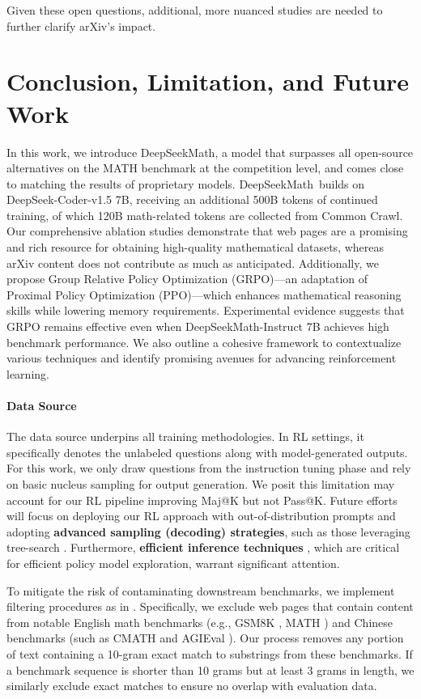 \begin{itemize}[topsep=0pt]
Given these open questions, additional, more nuanced studies are needed to further clarify arXiv’s impact.

\section{Conclusion, Limitation, and Future Work} In this work, we introduce DeepSeekMath, a model that surpasses all open-source alternatives on the MATH benchmark at the competition level, and comes close to matching the results of proprietary models. DeepSeekMath~builds on DeepSeek-Coder-v1.5 7B, receiving an additional 500B tokens of continued training, of which 120B math-related tokens are collected from Common Crawl. Our comprehensive ablation studies demonstrate that web pages are a promising and rich resource for obtaining high-quality mathematical datasets, whereas arXiv content does not contribute as much as anticipated. Additionally, we propose Group Relative Policy Optimization (GRPO)—an adaptation of Proximal Policy Optimization (PPO)—which enhances mathematical reasoning skills while lowering memory requirements. Experimental evidence suggests that GRPO remains effective even when DeepSeekMath-Instruct 7B achieves high benchmark performance. We also outline a cohesive framework to contextualize various techniques and identify promising avenues for advancing reinforcement learning.

\paragraph{Data Source} The data source underpins all training methodologies. In RL settings, it specifically denotes the unlabeled questions along with model-generated outputs. For this work, we only draw questions from the instruction tuning phase and rely on basic nucleus sampling for output generation. We posit this limitation may account for our RL pipeline improving Maj@K but not Pass@K. Future efforts will focus on deploying our RL approach with out-of-distribution prompts and adopting \textbf{advanced sampling (decoding) strategies}, such as those leveraging tree-search \citep{yao2023tree}. Furthermore, \textbf{efficient inference techniques} \citep{xia-etal-2023-speculative,leviathan2023fast,kwon2023efficient,xia2024unlocking}, which are critical for efficient policy model exploration, warrant significant attention.

To mitigate the risk of contaminating downstream benchmarks, we implement filtering procedures as in \cite{deepseek-coder}. Specifically, we exclude web pages that contain content from notable English math benchmarks (e.g., GSM8K \citep{gsm8k}, MATH \citep{MATH}) and Chinese benchmarks (such as CMATH \citep{wei2023cmath} and AGIEval \citep{agieval}). Our process removes any portion of text containing a 10-gram exact match to substrings from these benchmarks. If a benchmark sequence is shorter than 10 grams but at least 3 grams in length, we similarly exclude exact matches to ensure no overlap with evaluation data.


\end{itemize}
